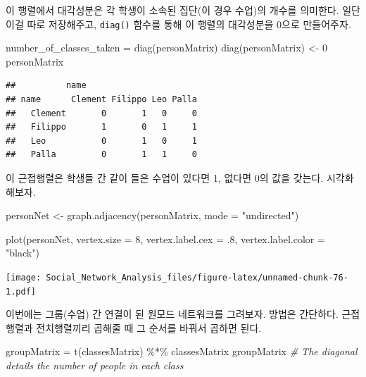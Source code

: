 \documentclass[
]{book}
\newenvironment{Shaded}{\begin{snugshade}}{\end{snugshade}}
\newcommand{\AttributeTok}[1]{\textcolor[rgb]{0.77,0.63,0.00}{#1}}
\newcommand{\CommentTok}[1]{\textcolor[rgb]{0.56,0.35,0.01}{\textit{#1}}}
\newcommand{\DecValTok}[1]{\textcolor[rgb]{0.00,0.00,0.81}{#1}}
\newcommand{\FunctionTok}[1]{\textcolor[rgb]{0.00,0.00,0.00}{#1}}
\newcommand{\NormalTok}[1]{#1}
\newcommand{\OtherTok}[1]{\textcolor[rgb]{0.56,0.35,0.01}{#1}}
\newcommand{\SpecialCharTok}[1]{\textcolor[rgb]{0.00,0.00,0.00}{#1}}
\newcommand{\StringTok}[1]{\textcolor[rgb]{0.31,0.60,0.02}{#1}}
\begin{document}
이 행렬에서 대각성분은 각 학생이 소속된 집단(이 경우 수업)의 개수를 의미한다. 일단 이걸 따로 저장해주고, \texttt{diag()} 함수를 통해 이 행렬의 대각성분을 0으로 만들어주자.

\begin{Shaded}
\begin{Highlighting}[]
\NormalTok{number\_of\_classes\_taken }\OtherTok{=} \FunctionTok{diag}\NormalTok{(personMatrix)}
\FunctionTok{diag}\NormalTok{(personMatrix) }\OtherTok{\textless{}{-}} \DecValTok{0} 
\NormalTok{personMatrix}
\end{Highlighting}
\end{Shaded}

\begin{verbatim}
##          name
## name      Clement Filippo Leo Palla
##   Clement       0       1   0     0
##   Filippo       1       0   1     1
##   Leo           0       1   0     1
##   Palla         0       1   1     0
\end{verbatim}

이 근접행렬은 학생들 간 같이 들은 수업이 있다면 1, 없다면 0의 값을 갖는다. 시각화해보자.

\begin{Shaded}
\begin{Highlighting}[]
\NormalTok{personNet }\OtherTok{\textless{}{-}} \FunctionTok{graph.adjacency}\NormalTok{(personMatrix, }\AttributeTok{mode =} \StringTok{"undirected"}\NormalTok{)}

\FunctionTok{plot}\NormalTok{(personNet, }\AttributeTok{vertex.size =} \DecValTok{8}\NormalTok{, }\AttributeTok{vertex.label.cex =}\NormalTok{ .}\DecValTok{8}\NormalTok{, }\AttributeTok{vertex.label.color =} \StringTok{"black"}\NormalTok{)}
\end{Highlighting}
\end{Shaded}

\texttt{[image: Social\_Network\_Analysis\_files/figure-latex/unnamed-chunk-76-1.pdf]}

이번에는 그룹(수업) 간 연결이 된 원모드 네트워크를 그려보자. 방법은 간단하다. 근접행렬과 전치행렬끼리 곱해줄 때 그 순서를 바꿔서 곱하면 된다.

\begin{Shaded}
\begin{Highlighting}[]
\NormalTok{groupMatrix }\OtherTok{=} \FunctionTok{t}\NormalTok{(classesMatrix) }\SpecialCharTok{\%*\%}\NormalTok{ classesMatrix}
\NormalTok{groupMatrix }\CommentTok{\# The diagonal details the number of people in each class}
\end{Highlighting}
\end{Shaded}
\end{document}
